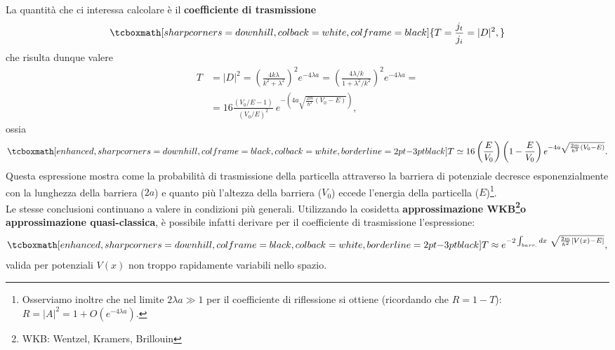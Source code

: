 La quantità che ci interessa calcolare è il \textbf{coefficiente di trasmissione}
	\begin{equation}
		\tcboxmath[sharp corners=downhill, colback=white, colframe=black]{
			T=\frac{j_t}{j_i}=|D|^2,
			}
	\end{equation}
che risulta dunque valere
	\begin{align}
		T &= |D|^2= \left(\frac{4k\lambda}{k^2+\lambda ^2} \right) ^2 e^{-4\lambda a} =\left(\frac{4\lambda /k}{1+\lambda ^2/k^2} \right) ^2 e^{-4\lambda a}= \nonumber \\[0.3cm]
		&=16\frac{\left(V_0 /E-1\right)}{\left(V_0 /E \right) ^2}\ e^{-\left(4a\sqrt{\frac{2m}{\hbar ^2}\left(V_0-E\right)}\right)},
	\end{align}
ossia
	\begin{equation}
		\tcboxmath[enhanced, sharp corners=downhill, colframe=black, colback=white, borderline={2pt}{-3pt}{black}]{
			T \simeq 16 \left(\frac{E}{V_0} \right) \left(1-\frac{E}{V_0}\right) e^{-4a\sqrt{\frac{2m}{\hbar ^2}\left(V_0-E\right)}}.
			}
	\end{equation}
Questa espressione mostra come la probabilità di trasmissione della particella attraverso la barriera di potenziale decresce esponenzialmente con la lunghezza della barriera ($2a$) e quanto più l'altezza della barriera ($V_0$) eccede l'energia della particella ($E$)\footnote{Osserviamo inoltre che nel limite $2\lambda a \gg 1 $ per il coefficiente di riflessione si ottiene (ricordando che $R=1-T$): $
 R=|A|^2=1+O(e^{-4\lambda a})$.}.\\

Le stesse conclusioni continuano a valere in condizioni più generali. Utilizzando la cosidetta \textbf{approssimazione WKB\footnote{WKB: Wentzel, Kramers, Brillouin}o approssimazione quasi-classica}, è possibile infatti derivare per il coefficiente di trasmissione l'espressione:
	\begin{equation}
		\tcboxmath[enhanced, sharp corners=downhill, colframe=black, colback=white, borderline={2pt}{-3pt}{black}]{
			T \approx e^{-2 \int_{barr.} dx\ \sqrt{\frac{2m}{\hbar ^2}\left[ V(x)-E \right]}},
			}
		 \end{equation}
valida per potenziali $V(x)$ non troppo rapidamente variabili nello spazio.\\

